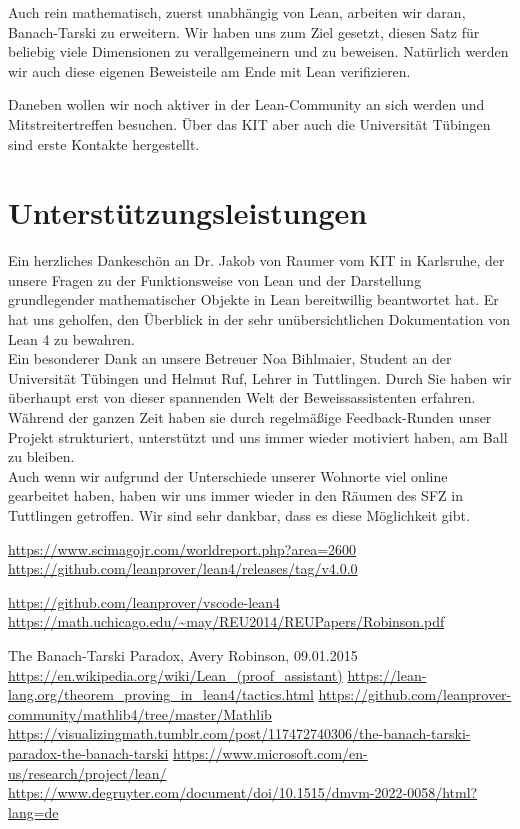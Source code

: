 \documentclass[10pt]{article}
\begin{document}
\noindent Auch rein mathematisch, zuerst unabhängig von Lean, arbeiten wir daran, Banach-Tarski zu erweitern. Wir haben uns zum Ziel gesetzt, diesen Satz für beliebig viele Dimensionen zu verallgemeinern und zu beweisen. Natürlich werden wir auch diese eigenen Beweisteile am Ende mit Lean verifizieren.

\noindent Daneben wollen wir noch aktiver in der Lean-Community an sich werden und Mitstreitertreffen besuchen. Über das KIT aber auch die Universität Tübingen sind erste Kontakte hergestellt.    

\newpage
\section{Unterstützungsleistungen}
Ein herzliches Dankeschön an Dr. Jakob von Raumer vom KIT in Karlsruhe, der unsere Fragen zu der Funktionsweise von Lean und der Darstellung grundlegender mathematischer Objekte in Lean bereitwillig beantwortet hat. Er hat uns geholfen, den Überblick in der sehr unübersichtlichen Dokumentation von Lean 4 zu bewahren. \\

\noindent Ein besonderer Dank an unsere Betreuer Noa Bihlmaier, Student an der Universität Tübingen und Helmut Ruf, Lehrer in Tuttlingen. Durch Sie haben wir überhaupt erst von dieser spannenden Welt der Beweissassistenten erfahren. Während der ganzen Zeit haben sie durch regelmäßige Feedback-Runden unser Projekt strukturiert, unterstützt und uns immer wieder motiviert haben, am Ball zu bleiben. \\

\noindent Auch wenn wir aufgrund der Unterschiede unserer Wohnorte viel online gearbeitet haben, haben wir uns immer wieder in den Räumen des SFZ in Tuttlingen getroffen. Wir sind sehr dankbar, dass es diese Möglichkeit gibt. 


\renewcommand\refname{Quellenverzeichnis}
\begin{thebibliography}{99}
\url{https://www.scimagojr.com/worldreport.php?area=2600}
\url{https://github.com/leanprover/lean4/releases/tag/v4.0.0}\par
{}
\url{https://github.com/leanprover/vscode-lean4}
\url{https://math.uchicago.edu/~may/REU2014/REUPapers/Robinson.pdf} \par
The Banach-Tarski Paradox, Avery Robinson, 09.01.2015
\url{https://en.wikipedia.org/wiki/Lean_(proof_assistant)}
 \url{https://lean-lang.org/theorem_proving_in_lean4/tactics.html}
 \url{https://github.com/leanprover-community/mathlib4/tree/master/Mathlib}
\url{https://visualizingmath.tumblr.com/post/117472740306/the-banach-tarski-paradox-the-banach-tarski}
\url{https://www.microsoft.com/en-us/research/project/lean/}
\url{https://www.degruyter.com/document/doi/10.1515/dmvm-2022-0058/html?lang=de}
\end{thebibliography}

\end{document}
